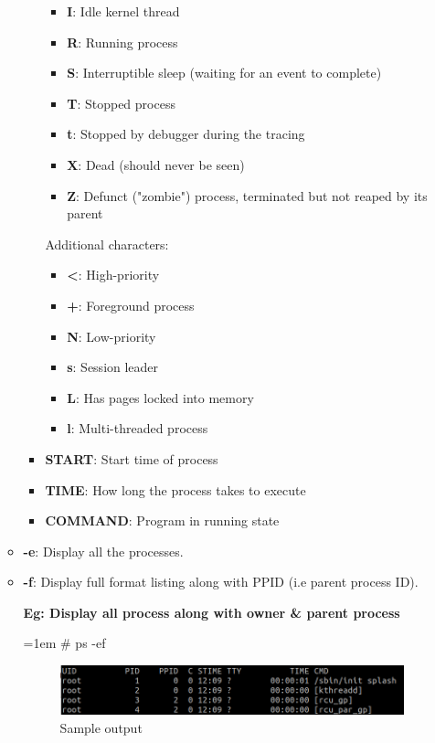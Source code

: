 \begin{flushleft}
\begin{itemize}
\begin{itemize}
\begin{itemize}
\begin{itemize}
						\item \textbf{I}: Idle kernel thread
						\item \textbf{R}: Running process
						\item \textbf{S}: Interruptible sleep (waiting for an event to complete)
						\item \textbf{T}: Stopped process
						\item \textbf{t}: Stopped by debugger during the tracing
						\item \textbf{X}: Dead (should never be seen)
						\item \textbf{Z}: Defunct ("zombie") process, terminated but not reaped by
						its parent
					\end{itemize}
					Additional characters:
					\begin{itemize}
						\item \textbf{<}: High-priority
						\item \textbf{+}: Foreground process
						\item \textbf{N}: Low-priority
						\item \textbf{s}: Session leader
						\item \textbf{L}: Has pages locked into memory
						\item \textbf{l}: Multi-threaded process
					\end{itemize}
					\item \textbf{START}: Start time of process
					\item \textbf{TIME}: How long the process takes to execute
					\item \textbf{COMMAND}: Program in running state
			\end{itemize}
			
			\newpage
			
			
			\item \textbf{-e}: Display all the processes.
			\item \textbf{-f}: Display full format listing along with PPID (i.e parent process ID).
			
			\textbf{Eg: Display all process along with owner \& parent process}
			\begin{tcolorbox}[breakable,notitle,boxrule=-0pt,colback=black,colframe=black]
				\color{green}
				\font=1em
				\# ps -ef
				\font=4pt
			\end{tcolorbox}
			\begin{figure}[h!]
				\centering
				\includegraphics[scale=.38]{content/chapter12/images/ps2.png}
				\caption{Sample output}
				\label{fig:process2348}
			\end{figure}
		

\end{itemize}
\end{itemize}
\end{flushleft}
